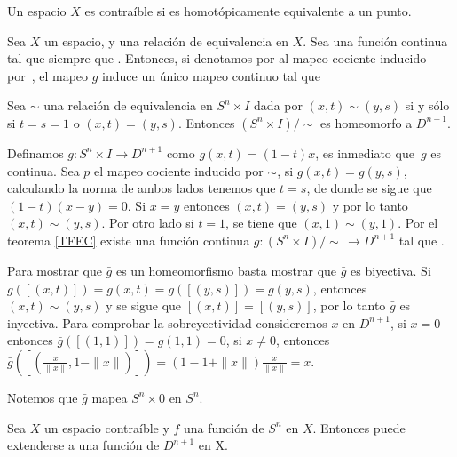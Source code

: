 \begin{Defi}
Un espacio $X$ es contraíble si es homotópicamente equivalente a un punto.
\end{Defi}

\begin{Teo}\label{TFEC}
Sea $X$ un espacio, y \mm{\sim} una relación de equivalencia en
$X$. Sea  una función continua tal que
 siempre que . Entonces, si denotamos por
 al mapeo cociente inducido
por~\mm{\sim}, el mapeo $g$ induce un único mapeo continuo
 tal que 
\end{Teo}
\begin{Lema}\label{lemah}
Sea $\sim$ una relación de equivalencia en $S^n\times I$ dada por $(x,t)\sim (y,s)$ si y sólo si $t = s = 1$ o $(x,t)=(y,s)$. Entonces $(S^n\times I)/\!\!\!\sim$ es homeomorfo a $D^{n+1}$.
\end{Lema}
\begin{Dem}

Definamos $g\colon S^n\times I\rightarrow D^{n+1}$ como $g(x,t) =
(1-t)x$, es inmediato que~$g$ es continua. Sea $p$ el mapeo cociente inducido por $\sim$, si $g(x,t) = g(y,s)$, calculando la norma de ambos lados tenemos que  $t = s$, de donde se sigue que $(1-t)(x-y)=0$. Si $x = y$ entonces $(x,t) = (y,s)$ y por lo tanto $(x,t)\sim (y,s)$. Por otro lado si $t = 1$, se tiene que $(x,1)\sim(y,1)$.
Por el teorema \ref{TFEC} existe una función continua $\bar{g}\colon (S^n\times I)/\!\!\!\sim\,\rightarrow D^{n+1}$ tal que .

Para mostrar que $\bar{g}$ es un homeomorfismo basta mostrar que $\bar{g}$ es biyectiva.
Si  $\bar{g}([(x,t)]) =g(x,t)= \bar{g}([(y,s)]) = g(y,s)$, entonces
$(x,t)\sim (y,s)$ y se sigue que $[(x,t)] = [(y,s)]$, por lo tanto $\bar{g}$ es inyectiva.
Para comprobar la sobreyectividad consideremos $x$ en $D^{n+1}$, si $x=0$ entonces $\bar{g}([(1,1)])= g(1,1) = 0$, si $x\neq 0$, entonces $\bar{g}([(\frac{x}{\parallel x\parallel},1-\parallel x\parallel)]) = (1-1+\parallel x\parallel)\frac{x}{\parallel x\parallel} = x$. 

Notemos que $\bar{g}$ mapea $S^n\times{0}$ en $S^n$.


\end{Dem}
\begin{Teo}
Sea $X$ un espacio contraíble y $f$ una función de $S^n$ en $X$. Entonces  puede extenderse a una función de $D^{n+1}$ en X.
\end{Teo}
 
